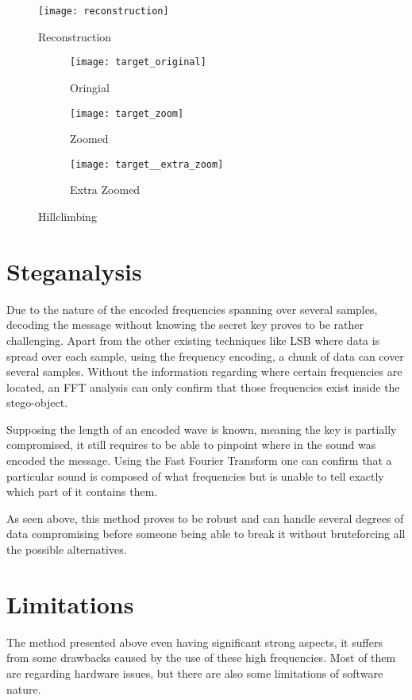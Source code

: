 \documentclass[12pt]{report}
\begin{document}
\begin{figure}[h]
\centering
\texttt{[image: reconstruction]}
\caption{Reconstruction}
\label{fig:reconstruction}
\end{figure}

\begin{figure}[h!]
  \centering
  \begin{subfigure}[b]{0.9\linewidth}
    \texttt{[image: target\_original]}
    \caption{Oringial}
    \label{fig:original}
  \end{subfigure}
  \begin{subfigure}[b]{0.9\linewidth}
    \texttt{[image: target\_zoom]}
    \caption{Zoomed}
    \label{fig:zoom}
  \end{subfigure}
  \begin{subfigure}[b]{0.9\linewidth}
    \texttt{[image: target\_\_extra\_zoom]}
    \caption{Extra Zoomed}
    \label{fig:ezoom}
  \end{subfigure}
  \caption{Hillclimbing}
  \label{fig:approximation}
\end{figure}


\section{Steganalysis}
Due to the nature of the encoded frequencies spanning over several samples, decoding the message without knowing the secret key proves to be rather challenging. Apart from the other existing techniques like LSB where data is spread over each sample, using the frequency encoding, a chunk of data can cover several samples. Without the information regarding where certain frequencies are located, an FFT analysis can only confirm that those frequencies exist inside the stego-object.

Supposing the length of an encoded wave is known, meaning the key is partially compromised, it still requires to be able to pinpoint where in the sound was encoded the message. Using the Fast Fourier Transform one can confirm that a particular sound is composed of what frequencies but is unable to tell exactly which part of it contains them. 

As seen above, this method proves to be robust and can handle several degrees of data compromising before someone being able to break it without bruteforcing all the possible alternatives.


\section{Limitations}
The method presented above even having significant strong aspects, it suffers from some drawbacks caused by the use of these high frequencies. Most of them are regarding hardware issues, but there are also some limitations of software nature.
\end{document}
